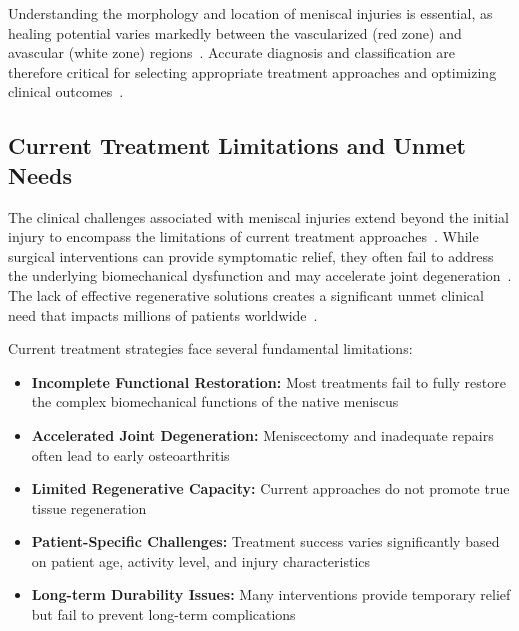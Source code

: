 Understanding the morphology and location of meniscal injuries is essential, as healing potential varies markedly between the vascularized (red zone) and avascular (white zone) regions~\cite{athanasiou2009engineeringknee, tran2020comprehensivereview, makris2011kneemeniscus, baek2015meniscustissue}.
Accurate diagnosis and classification are therefore critical for selecting appropriate treatment approaches and optimizing clinical outcomes~\cite{mordecai2014treatmentmeniscal, abdelgaied2015comparisonbiomechanical}.

\subsection{Current Treatment Limitations and Unmet Needs}

The clinical challenges associated with meniscal injuries extend beyond the initial injury to encompass the limitations of current treatment approaches~\cite{mordecai2014treatmentmeniscal, kwon2019surgicaltissue, baek2015meniscustissue}. While surgical interventions can provide symptomatic relief, they often fail to address the underlying biomechanical dysfunction and may accelerate joint degeneration~\cite{athanasiou2009engineeringknee, abdelgaied2015comparisonbiomechanical, mordecai2014treatmentmeniscal}. The lack of effective regenerative solutions creates a significant unmet clinical need that impacts millions of patients worldwide~\cite{beeler2020meniscussizing, baek2015meniscustissue}.

Current treatment strategies face several fundamental limitations:

\begin{itemize}
    \item \textbf{Incomplete Functional Restoration:} Most treatments fail to fully restore the complex biomechanical functions of the native meniscus~\cite{makris2011kneemeniscus, athanasiou2009engineeringknee, abdelgaied2015comparisonbiomechanical}
    \item \textbf{Accelerated Joint Degeneration:} Meniscectomy and inadequate repairs often lead to early osteoarthritis~\cite{mordecai2014treatmentmeniscal, abdelgaied2015comparisonbiomechanical, baek2015meniscustissue}
    \item \textbf{Limited Regenerative Capacity:} Current approaches do not promote true tissue regeneration~\cite{kwon2019surgicaltissue, li2024advancedhydrogel, baek2015meniscustissue}
    \item \textbf{Patient-Specific Challenges:} Treatment success varies significantly based on patient age, activity level, and injury characteristics~\cite{mordecai2014treatmentmeniscal, beeler2020meniscussizing, tran2020comprehensivereview}
    \item \textbf{Long-term Durability Issues:} Many interventions provide temporary relief but fail to prevent long-term complications~\cite{ghodbane2019partialmeniscus, sun2017overviewscaffold, kwon2019surgicaltissue}
\end{itemize}

